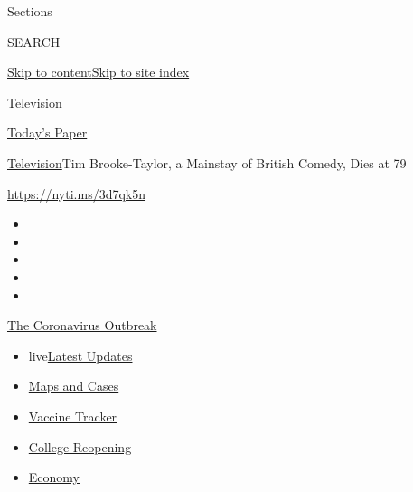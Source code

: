 Sections

SEARCH

\protect\hyperlink{site-content}{Skip to
content}\protect\hyperlink{site-index}{Skip to site index}

\href{https://www.nytimes.com/section/arts/television}{Television}

\href{https://myaccount.nytimes.com/auth/login?response_type=cookie\&client_id=vi}{}

\href{https://www.nytimes.com/section/todayspaper}{Today's Paper}

\href{/section/arts/television}{Television}\textbar{}Tim Brooke-Taylor,
a Mainstay of British Comedy, Dies at 79

\url{https://nyti.ms/3d7qk5n}

\begin{itemize}
\item
\item
\item
\item
\item
\end{itemize}

\href{https://www.nytimes.com/news-event/coronavirus?action=click\&pgtype=Article\&state=default\&region=TOP_BANNER\&context=storylines_menu}{The
Coronavirus Outbreak}

\begin{itemize}
\tightlist
\item
  live\href{https://www.nytimes.com/2020/08/03/world/coronavirus-covid-19.html?action=click\&pgtype=Article\&state=default\&region=TOP_BANNER\&context=storylines_menu}{Latest
  Updates}
\item
  \href{https://www.nytimes.com/interactive/2020/us/coronavirus-us-cases.html?action=click\&pgtype=Article\&state=default\&region=TOP_BANNER\&context=storylines_menu}{Maps
  and Cases}
\item
  \href{https://www.nytimes.com/interactive/2020/science/coronavirus-vaccine-tracker.html?action=click\&pgtype=Article\&state=default\&region=TOP_BANNER\&context=storylines_menu}{Vaccine
  Tracker}
\item
  \href{https://www.nytimes.com/2020/08/02/us/covid-college-reopening.html?action=click\&pgtype=Article\&state=default\&region=TOP_BANNER\&context=storylines_menu}{College
  Reopening}
\item
  \href{https://www.nytimes.com/live/2020/08/03/business/stock-market-today-coronavirus?action=click\&pgtype=Article\&state=default\&region=TOP_BANNER\&context=storylines_menu}{Economy}
\end{itemize}

